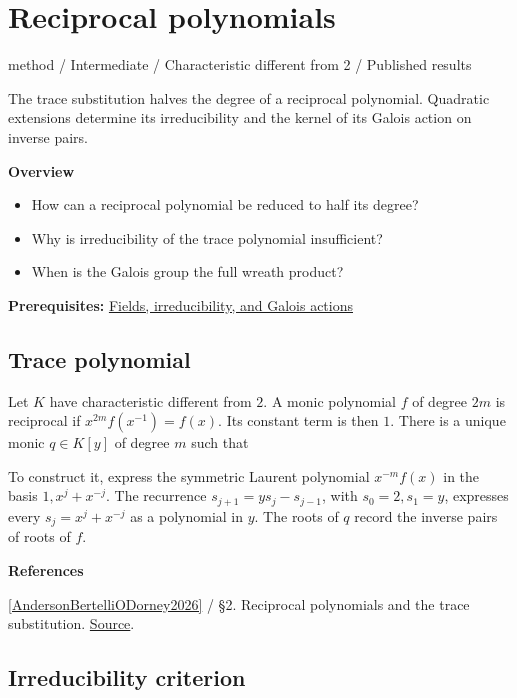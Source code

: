 \documentclass[11pt,a4paper,oneside,openany]{book}
\newcommand{\atlasdisplay}[1]{\par\begingroup\centering\vspace{3pt}\noindent\adjustbox{max width=\linewidth}{\(\displaystyle #1\)}\par\vspace{5pt}\endgroup}
\newenvironment{sources}{\par\smallskip\begingroup\footnotesize\color{atlasgray}\leftskip=10pt\setlength{\parskip}{2pt}}{\par\endgroup\smallskip}
\begin{document}
\chapter{Reciprocal polynomials}\label{article:reciprocity}\hypertarget{article:reciprocity}{}\color{black}
{\sffamily\small\color{atlasgold}method / Intermediate / Characteristic different from 2 / Published results}\par\medskip
The trace substitution halves the degree of a reciprocal polynomial. Quadratic extensions determine its irreducibility and the kernel of its Galois action on inverse pairs.\par\medskip
\textbf{Overview}\begin{itemize}
\item How can a reciprocal polynomial be reduced to half its degree?
\item Why is irreducibility of the trace polynomial insufficient?
\item When is the Galois group the full wreath product?
\end{itemize}
{\small\textbf{Prerequisites:} \hyperlink{article:foundations}{Fields, irreducibility, and Galois actions}}\par
{}\section{Trace polynomial}
\color{black} Let \(K\) have characteristic different from \(2\). A monic polynomial \(f\) of degree \(2m\) is reciprocal if \(x^{2m}f(x^{-1})=f(x)\). Its constant term is then \(1\). There is a unique monic \(q\in K[y]\) of degree \(m\) such that\par

\atlasdisplay{f(x)=x^m q(x+x^{-1}).}
\color{black} To construct it, express the symmetric Laurent polynomial \(x^{-m}f(x)\) in the basis \(1,x^j+x^{-j}\). The recurrence \(s_{j+1}=ys_j-s_{j-1}\), with \(s_0=2,s_1=y\), expresses every \(s_j=x^j+x^{-j}\) as a polynomial in \(y\). The roots of \(q\) record the inverse pairs of roots of \(f\).\par
\begin{sources}
\textbf{References}\par\smallskip
\noindent\hyperlink{ref:AndersonBertelliODorney2026}{[AndersonBertelliODorney2026]} / §2. Reciprocal polynomials and the trace substitution. \href{https://arxiv.org/abs/2406.18970v2}{Source}.\par
\end{sources}\color{black}
\section{Irreducibility criterion}
\end{document}
